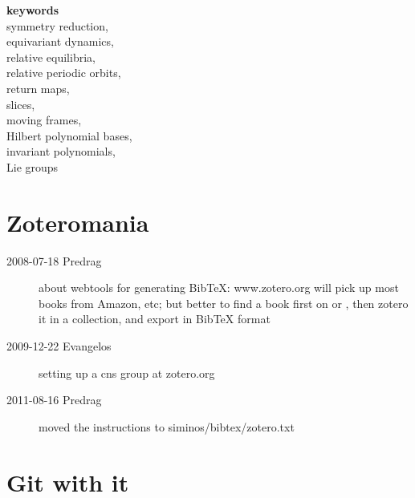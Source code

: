 						\noindent
\textbf{keywords}	\\
symmetry reduction,	\\
equivariant dynamics,	\\
relative equilibria,	\\
relative periodic orbits,	\\
return maps,	\\
slices,	\\
moving frames,	\\
Hilbert polynomial bases,	\\
invariant polynomials,	\\
Lie groups	\\

\section{Zoteromania}

\begin{description}

\item[2008-07-18 Predrag] about webtools for generating BibTeX:
www.zotero.org
        will pick up most books from Amazon, etc; but
        better to find a book first on
          or
, then zotero it
          in a collection, and export in BibTeX format

\item[2009-12-22 Evangelos]
setting up a cns group at zotero.org

\item[2011-08-16 Predrag] moved the instructions to siminos/bibtex/zotero.txt

\end{description}

\section{Git with it}

